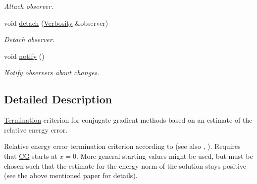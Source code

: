 \begin{DoxyCompactItemize}
\begin{DoxyCompactList}\small\item\em Attach observer. \end{DoxyCompactList}\item 
\hypertarget{classSpacy_1_1Mixin_1_1MixinConnection_adda739590c487679c26f60e50aedb73f}{void \hyperlink{classSpacy_1_1Mixin_1_1MixinConnection_adda739590c487679c26f60e50aedb73f}{detach} (\hyperlink{classSpacy_1_1Mixin_1_1Verbosity_aefe2f237b0456c4bced001fbfa75f92e}{Verbosity} \&observer)}\label{classSpacy_1_1Mixin_1_1MixinConnection_adda739590c487679c26f60e50aedb73f}

\begin{DoxyCompactList}\small\item\em Detach observer. \end{DoxyCompactList}\item 
\hypertarget{classSpacy_1_1Mixin_1_1MixinConnection_a1ddeaa78a3bb4a38c2cca36d1f99fe36}{void \hyperlink{classSpacy_1_1Mixin_1_1MixinConnection_a1ddeaa78a3bb4a38c2cca36d1f99fe36}{notify} ()}\label{classSpacy_1_1Mixin_1_1MixinConnection_a1ddeaa78a3bb4a38c2cca36d1f99fe36}

\begin{DoxyCompactList}\small\item\em Notify observers about changes. \end{DoxyCompactList}\end{DoxyCompactItemize}


\subsection{Detailed Description}
\hyperlink{namespaceSpacy_1_1CG_1_1Termination}{Termination} criterion for conjugate gradient methods based on an estimate of the relative energy error. 

Relative energy error termination criterion according to \cite{Strakos2005} (see also \cite{Hestenes1952}, \cite{Arioli2004}). Requires that \hyperlink{namespaceSpacy_1_1CG}{C\-G} starts at $ x = 0 $. More general starting values might be used, but must be chosen such that the estimate for the energy norm of the solution stays positive (see the above mentioned paper for details). 

